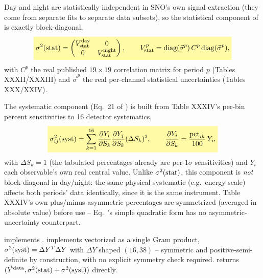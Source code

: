 \begin{theorybox}
Day and night are statistically independent in SNO's own signal extraction
(they come from separate fits to separate data subsets), so the
statistical component of  is exactly
block-diagonal,
\begin{equation}
  \keyresult{\sigma^2({\rm stat}) = \begin{pmatrix} V_{\rm stat}^{\rm day} & 0 \\ 0 & V_{\rm stat}^{\rm night}\end{pmatrix},
    \qquad V_{\rm stat}^{p} = {\rm diag}(\vec\sigma^p)\,C^p\,{\rm diag}(\vec\sigma^p),}
  \label{eq:stat-covariance}
\end{equation}
with $C^p$ the real published $19\times19$ correlation matrix for period
$p$ (Tables XXXII/XXXIII) and $\vec\sigma^p$ the real per-channel
statistical uncertainties (Tables XXX/XXIV).

The systematic component (Eq.~21 of \cite{Aharmim2005SaltPhase}) is built
from Table XXXIV's per-bin percent sensitivities to 16 detector
systematics,
\begin{equation}
  \keyresult{\sigma_{ij}^2({\rm syst}) = \sum_{k=1}^{16}\frac{\partial Y_i}{\partial S_k}
    \frac{\partial Y_j}{\partial S_k}(\Delta S_k)^2,
    \qquad \frac{\partial Y_i}{\partial S_k} = \frac{{\rm pct}_{ik}}{100}\,Y_i,}
  \label{eq:syst-covariance}
\end{equation}
with $\Delta S_k=1$ (the tabulated percentages already are per-$1\sigma$
sensitivities) and $Y_i$ each observable's own real central value. Unlike
$\sigma^2({\rm stat})$, this component is \emph{not} block-diagonal in
day/night: the same physical systematic (e.g.\ energy scale) affects both
periods' data identically, since it is the same instrument. Table XXXIV's
own plus/minus asymmetric percentages are symmetrized (averaged in
absolute value) before use -- Eq.~'s simple
quadratic form has no asymmetric-uncertainty counterpart.
\end{theorybox}

\begin{implbox}
 implements
. 
implements  vectorized as a single Gram
product, $\sigma^2({\rm syst}) = \Delta Y^T\Delta Y$ with $\Delta Y$ shaped
$(16,38)$ -- symmetric and positive-semi-definite by construction, with no
explicit symmetry check required. 
returns $(\vec Y^{\rm data}, \sigma^2({\rm stat})+\sigma^2({\rm syst}))$
directly.
\end{implbox}

